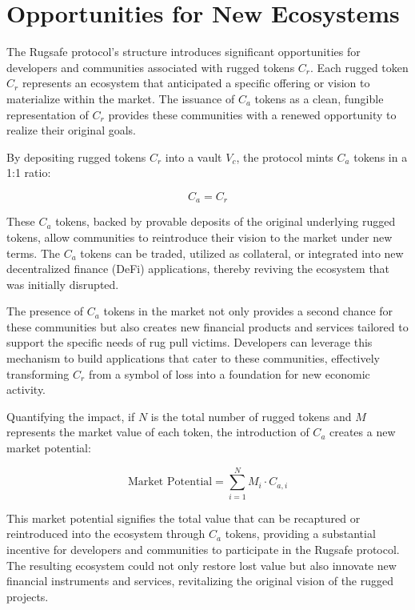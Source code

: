 \documentclass{article}
\begin{document}




\section{Opportunities for New Ecosystems}
The Rugsafe protocol's structure introduces significant opportunities for developers and communities associated with rugged tokens $C_r$. Each rugged token $C_r$ represents an ecosystem that anticipated a specific offering or vision to materialize within the market. The issuance of $C_a$ tokens as a clean, fungible representation of $C_r$ provides these communities with a renewed opportunity to realize their original goals.

By depositing rugged tokens $C_r$ into a vault $V_c$, the protocol mints $C_a$ tokens in a 1:1 ratio:

\[
C_a = C_r
\]

These $C_a$ tokens, backed by provable deposits of the original underlying rugged tokens, allow communities to reintroduce their vision to the market under new terms. The $C_a$ tokens can be traded, utilized as collateral, or integrated into new decentralized finance (DeFi) applications, thereby reviving the ecosystem that was initially disrupted.

The presence of $C_a$ tokens in the market not only provides a second chance for these communities but also creates new financial products and services tailored to support the specific needs of rug pull victims. Developers can leverage this mechanism to build applications that cater to these communities, effectively transforming $C_r$ from a symbol of loss into a foundation for new economic activity.

Quantifying the impact, if $N$ is the total number of rugged tokens and $M$ represents the market value of each token, the introduction of $C_a$ creates a new market potential:

\[
\text{Market Potential} = \sum_{i=1}^{N} M_i \cdot C_{a,i}
\]

This market potential signifies the total value that can be recaptured or reintroduced into the ecosystem through $C_a$ tokens, providing a substantial incentive for developers and communities to participate in the Rugsafe protocol. The resulting ecosystem could not only restore lost value but also innovate new financial instruments and services, revitalizing the original vision of the rugged projects.
\end{document}
